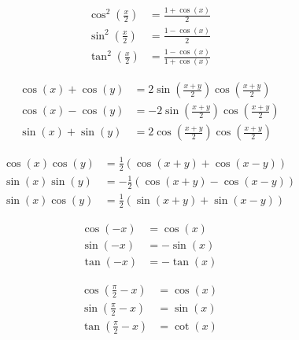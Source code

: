 \documentclass[leqno,autodetect-engine,dvipdfmx-if-dvi,ja=standard,a4paper,12pt]{bxjsbook}
\begin{document}
				\begin{thm}[半角の公式]
					\begin{align}
						\cos^2 \left( \frac{x}{2} \right) &= \frac{1 + \cos(x)}{2} \\
						\sin^2 \left( \frac{x}{2} \right) &= \frac{1 - \cos(x)}{2} \\
						\tan^2 \left( \frac{x}{2} \right) &= \frac{1 - \cos(x)} {1 + \cos(x)}
					\end{align}
				\end{thm}
			
				\begin{thm}[和積公式]
					\begin{align}
						\cos(x) + \cos(y) &= 2 \sin \left( \frac{x+y}{2} \right) \cos \left( \frac{x+y}{2} \right) \\
						\cos(x) - \cos(y) &= -2 \sin \left( \frac{x+y}{2} \right) \cos \left( \frac{x+y}{2} \right) \\
						\sin(x) + \sin(y) &= 2 \cos \left( \frac{x+y}{2} \right) \cos \left( \frac{x+y}{2} \right) 
					\end{align}
				\end{thm}
			
				\begin{thm}[積和公式]
						\begin{align}
							\cos(x) \cos(y) &= \frac{1}{2} (\cos(x+y) + \cos(x-y)) \\
							\sin(x) \sin(y) &= -\frac{1}{2} (\cos(x+y) - \cos(x-y)) \\
							\sin(x) \cos(y) &=  \frac{1}{2} (\sin(x+y) + \sin(x-y))
						\end{align}
				\end{thm}
			
				\begin{thm}[負角公式]
					\begin{align}
						\cos(-x) &= \cos(x) \\
						\sin(-x) &= - \sin(x) \\
						\tan(-x) &= - \tan(x)
					\end{align}
				\end{thm}
			
				\begin{thm}[余角公式]
					\begin{align}
						\cos\left( \frac{\pi}{2} - x \right) & = \cos(x) \\
						\sin\left( \frac{\pi}{2} - x \right) & = \sin(x) \\
						\tan\left( \frac{\pi}{2} - x \right) & = \cot(x)
					\end{align}
				\end{thm}
				
\end{document}
